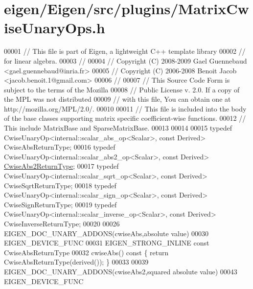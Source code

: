 \hypertarget{eigen_2_eigen_2src_2plugins_2_matrix_cwise_unary_ops_8h_source}{}\section{eigen/\+Eigen/src/plugins/\+Matrix\+Cwise\+Unary\+Ops.h}
\label{eigen_2_eigen_2src_2plugins_2_matrix_cwise_unary_ops_8h_source}

\begin{DoxyCode}
00001 \textcolor{comment}{// This file is part of Eigen, a lightweight C++ template library}
00002 \textcolor{comment}{// for linear algebra.}
00003 \textcolor{comment}{//}
00004 \textcolor{comment}{// Copyright (C) 2008-2009 Gael Guennebaud <gael.guennebaud@inria.fr>}
00005 \textcolor{comment}{// Copyright (C) 2006-2008 Benoit Jacob <jacob.benoit.1@gmail.com>}
00006 \textcolor{comment}{//}
00007 \textcolor{comment}{// This Source Code Form is subject to the terms of the Mozilla}
00008 \textcolor{comment}{// Public License v. 2.0. If a copy of the MPL was not distributed}
00009 \textcolor{comment}{// with this file, You can obtain one at http://mozilla.org/MPL/2.0/.}
00010 
00011 \textcolor{comment}{// This file is included into the body of the base classes supporting matrix specific coefficient-wise
       functions.}
00012 \textcolor{comment}{// This include MatrixBase and SparseMatrixBase.}
00013 
00014 
00015 \textcolor{keyword}{typedef} CwiseUnaryOp<internal::scalar\_abs\_op<Scalar>, \textcolor{keyword}{const} Derived> CwiseAbsReturnType;
00016 \textcolor{keyword}{typedef} CwiseUnaryOp<internal::scalar\_abs2\_op<Scalar>, \textcolor{keyword}{const} Derived> 
      \hyperlink{group___core___module_class_eigen_1_1_cwise_unary_op}{CwiseAbs2ReturnType};
00017 \textcolor{keyword}{typedef} CwiseUnaryOp<internal::scalar\_sqrt\_op<Scalar>, \textcolor{keyword}{const} Derived> CwiseSqrtReturnType;
00018 \textcolor{keyword}{typedef} CwiseUnaryOp<internal::scalar\_sign\_op<Scalar>, \textcolor{keyword}{const} Derived> CwiseSignReturnType;
00019 \textcolor{keyword}{typedef} CwiseUnaryOp<internal::scalar\_inverse\_op<Scalar>, \textcolor{keyword}{const} Derived> CwiseInverseReturnType;
00020 
00026 EIGEN\_DOC\_UNARY\_ADDONS(cwiseAbs,absolute value)
00030 EIGEN\_DEVICE\_FUNC
00031 EIGEN\_STRONG\_INLINE \textcolor{keyword}{const} CwiseAbsReturnType
00032 cwiseAbs()\textcolor{keyword}{ const }\{ \textcolor{keywordflow}{return} CwiseAbsReturnType(derived()); \}
00033 
00039 EIGEN\_DOC\_UNARY\_ADDONS(cwiseAbs2,squared absolute value)
00043 EIGEN\_DEVICE\_FUNC

\end{DoxyCode}

